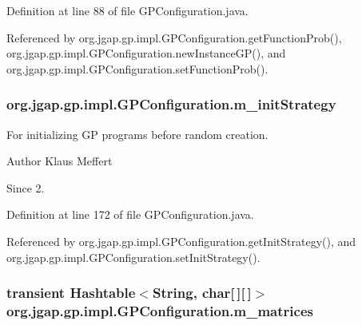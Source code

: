 Definition at line 88 of file G\-P\-Configuration.\-java.



Referenced by org.\-jgap.\-gp.\-impl.\-G\-P\-Configuration.\-get\-Function\-Prob(), org.\-jgap.\-gp.\-impl.\-G\-P\-Configuration.\-new\-Instance\-G\-P(), and org.\-jgap.\-gp.\-impl.\-G\-P\-Configuration.\-set\-Function\-Prob().

\hypertarget{classorg_1_1jgap_1_1gp_1_1impl_1_1_g_p_configuration_a1944f2e3debbd66e849566f0f14b885a}{
\subsubsection[{m\-\_\-init\-Strategy}]{ org.\-jgap.\-gp.\-impl.\-G\-P\-Configuration.\-m\-\_\-init\-Strategy\hspace{0.3cm}{\ttfamily [private]}}}\label{classorg_1_1jgap_1_1gp_1_1impl_1_1_g_p_configuration_a1944f2e3debbd66e849566f0f14b885a}
For initializing G\-P programs before random creation.

\begin{DoxyAuthor}{Author}
Klaus Meffert 
\end{DoxyAuthor}
\begin{DoxySince}{Since}
2. 
\end{DoxySince}


Definition at line 172 of file G\-P\-Configuration.\-java.



Referenced by org.\-jgap.\-gp.\-impl.\-G\-P\-Configuration.\-get\-Init\-Strategy(), and org.\-jgap.\-gp.\-impl.\-G\-P\-Configuration.\-set\-Init\-Strategy().

\hypertarget{classorg_1_1jgap_1_1gp_1_1impl_1_1_g_p_configuration_ad929121e2d7bb26b53dcb2dc87d20f14}{
\subsubsection[{m\-\_\-matrices}]{\setlength{\rightskip}{0pt plus 5cm}transient Hashtable$<$String, char\mbox{[}$\,$\mbox{]}\mbox{[}$\,$\mbox{]}$>$ org.\-jgap.\-gp.\-impl.\-G\-P\-Configuration.\-m\-\_\-matrices\hspace{0.3cm}{\ttfamily [private]}}}\label{classorg_1_1jgap_1_1gp_1_1impl_1_1_g_p_configuration_ad929121e2d7bb26b53dcb2dc87d20f14}


